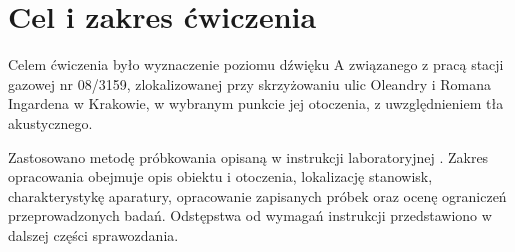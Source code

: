 \section{Cel i zakres ćwiczenia}
\label{sec:cel}
Celem ćwiczenia było wyznaczenie poziomu dźwięku A związanego
z pracą stacji gazowej nr 08/3159, zlokalizowanej przy skrzyżowaniu
ulic Oleandry i Romana Ingardena w Krakowie, w wybranym punkcie jej
otoczenia, z uwzględnieniem tła akustycznego.

Zastosowano metodę próbkowania opisaną w instrukcji laboratoryjnej
\autocite{piechowicz-konspekt}. Zakres opracowania obejmuje opis
obiektu i otoczenia, lokalizację stanowisk, charakterystykę aparatury,
opracowanie zapisanych próbek oraz ocenę ograniczeń przeprowadzonych
badań. Odstępstwa od wymagań instrukcji przedstawiono w dalszej
części sprawozdania.
